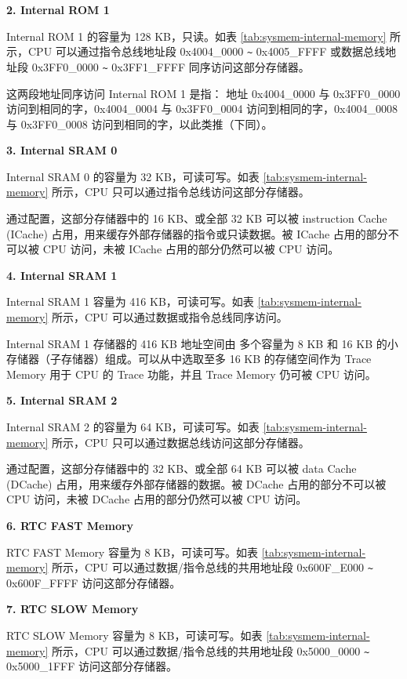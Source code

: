 \documentclass[main\_\_CN.tex]{subfiles}
\begin{document}
{\bfseries 2. Internal ROM 1}
\label{other:sysmem-internal-ROM-1}

Internal ROM 1 的容量为 128 KB，只读。如表 \ref{tab:sysmem-internal-memory} 所示，CPU 可以通过指令总线地址段 0x{}4004\_0000 \verb+~+ 0x{}4005\_FFFF 或数据总线地址段 0x{}3FF0\_0000 \verb+~+ 0x{}3FF1\_FFFF 同序访问这部分存储器。

这两段地址同序访问 Internal ROM 1 是指： 地址 0x{}4004\_0000 与 0x{}3FF0\_0000 访问到相同的字，0x{}4004\_0004 与 0x{}3FF0\_0004 访问到相同的字，0x{}4004\_0008 与 0x{}3FF0\_0008 访问到相同的字，以此类推（下同）。

{\bfseries 3. Internal SRAM 0}
\label{other:sysmem-internal-SRAM-0}

Internal SRAM 0 的容量为 32 KB，可读可写。如表 \ref{tab:sysmem-internal-memory} 所示，CPU 只可以通过指令总线访问这部分存储器。

通过配置，这部分存储器中的 16 KB、或全部 32 KB 可以被 instruction Cache (ICache) 占用，用来缓存外部存储器的指令或只读数据。被 ICache 占用的部分不可以被 CPU 访问，未被 ICache 占用的部分仍然可以被 CPU 访问。

{\bfseries 4. Internal SRAM 1}

Internal SRAM 1 容量为 416 KB，可读可写。如表 \ref{tab:sysmem-internal-memory} 所示，CPU 可以通过数据或指令总线同序访问。

Internal SRAM 1 存储器的 416 KB 地址空间由 多个容量为 8 KB 和 16 KB 的小存储器（子存储器）组成。可以从中选取至多 16 KB 的存储空间作为 Trace Memory 用于 CPU 的 Trace 功能，并且 Trace Memory 仍可被 CPU 访问。

{\bfseries 5. Internal SRAM 2}
\label{other:sysmem-internal-SRAM-2}

Internal SRAM 2 的容量为 64 KB，可读可写。如表 \ref{tab:sysmem-internal-memory} 所示，CPU 只可以通过数据总线访问这部分存储器。

通过配置，这部分存储器中的 32 KB、或全部 64 KB 可以被 data Cache (DCache) 占用，用来缓存外部存储器的数据。被 DCache 占用的部分不可以被 CPU 访问，未被 DCache 占用的部分仍然可以被 CPU 访问。


{\bfseries 6. RTC FAST Memory}

RTC FAST Memory 容量为 8 KB，可读可写。如表 \ref{tab:sysmem-internal-memory} 所示，CPU 可以通过数据/指令总线的共用地址段 0x{}600F\_E000 \verb+~+ 0x{}600F\_FFFF 访问这部分存储器。

{\bfseries 7. RTC SLOW Memory}

RTC SLOW Memory 容量为 8 KB，可读可写。如表 \ref{tab:sysmem-internal-memory} 所示，CPU 可以通过数据/指令总线的共用地址段 0x{}5000\_0000 \verb+~+ 0x{}5000\_1FFF 访问这部分存储器。
\end{document}
